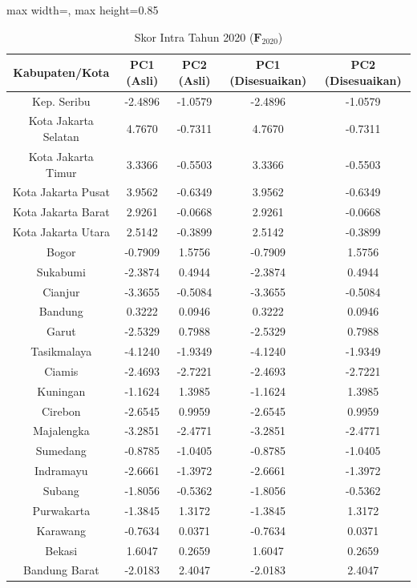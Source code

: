 \begin{table}[H]
\centering
\caption{Skor Intra Tahun 2020 ($\mathbf{F}_{2020}$)} \label{tab:app1skor_intra_2020}
\begin{adjustbox}{max width=\textwidth, max height=0.85\textheight}
\begin{tabular}{|c|c|c|c|c|}
\hline
\textbf{Kabupaten/Kota} & \textbf{PC1 (Asli)} & \textbf{PC2 (Asli)} & \textbf{PC1 (Disesuaikan)} & \textbf{PC2 (Disesuaikan)} \\
\hline
Kep. Seribu & -2.4896 & -1.0579 & -2.4896 & -1.0579 \\
Kota Jakarta Selatan & 4.7670 & -0.7311 & 4.7670 & -0.7311 \\
Kota Jakarta Timur & 3.3366 & -0.5503 & 3.3366 & -0.5503 \\
Kota Jakarta Pusat & 3.9562 & -0.6349 & 3.9562 & -0.6349 \\
Kota Jakarta Barat & 2.9261 & -0.0668 & 2.9261 & -0.0668 \\
Kota Jakarta Utara & 2.5142 & -0.3899 & 2.5142 & -0.3899 \\
Bogor & -0.7909 & 1.5756 & -0.7909 & 1.5756 \\
Sukabumi & -2.3874 & 0.4944 & -2.3874 & 0.4944 \\
Cianjur & -3.3655 & -0.5084 & -3.3655 & -0.5084 \\
Bandung & 0.3222 & 0.0946 & 0.3222 & 0.0946 \\
Garut & -2.5329 & 0.7988 & -2.5329 & 0.7988 \\
Tasikmalaya & -4.1240 & -1.9349 & -4.1240 & -1.9349 \\
Ciamis & -2.4693 & -2.7221 & -2.4693 & -2.7221 \\
Kuningan & -1.1624 & 1.3985 & -1.1624 & 1.3985 \\
Cirebon & -2.6545 & 0.9959 & -2.6545 & 0.9959 \\
Majalengka & -3.2851 & -2.4771 & -3.2851 & -2.4771 \\
Sumedang & -0.8785 & -1.0405 & -0.8785 & -1.0405 \\
Indramayu & -2.6661 & -1.3972 & -2.6661 & -1.3972 \\
Subang & -1.8056 & -0.5362 & -1.8056 & -0.5362 \\
Purwakarta & -1.3845 & 1.3172 & -1.3845 & 1.3172 \\
Karawang & -0.7634 & 0.0371 & -0.7634 & 0.0371 \\
Bekasi & 1.6047 & 0.2659 & 1.6047 & 0.2659 \\
Bandung Barat & -2.0183 & 2.4047 & -2.0183 & 2.4047 \\

\end{tabular}
\end{adjustbox}
\end{table}
